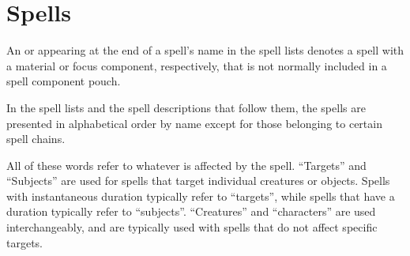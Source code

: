 \documentclass[twocolumn,oneside,letterpaper]{book} %
\begin{document}
\setcounter{chapter}{-1}
\tableofcontents






















\chapter{Spells}\label{Spells}

An \M{} or \F{} appearing at the end of a spell's name in the spell lists denotes a spell with a material or focus component, respectively, that is not normally included in a spell component pouch.

 In the spell lists and the spell descriptions that follow them, the spells are presented in alphabetical order by name except for those belonging to certain spell chains.

 All of these words refer to whatever is affected by the spell. ``Targets'' and ``Subjects'' are used for spells that target individual creatures or objects. Spells with instantaneous duration typically refer to ``targets'', while spells that have a duration typically refer to ``subjects''. ``Creatures'' and ``characters'' are used interchangeably, and are typically used with spells that do not affect specific targets.





\normalsize
\setlength\parindent{1em}
\appendix











\end{document}
